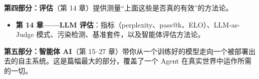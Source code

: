 \documentclass[11pt,a4paper,openany]{book}
\begin{document}
\textbf{第四部分：评估}（第 14 章）提供测量“上面这些是否真的有效”的方法论。

\begin{itemize}
  \item \textbf{第 14 章——LLM 评估}：指标（perplexity、pass@k、ELO）、LLM-as-Judge 模式、污染检测、基准套件，以及智能体评估方法论。
\end{itemize}

\textbf{第五部分：智能体 AI}（第 15--27 章）带你从一个训练好的模型走向一个被部署出去的自主系统。这是篇幅最大的部分，覆盖了一个 Agent 在真实世界中运作所需的一切。
\end{document}
